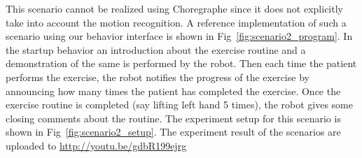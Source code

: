 This scenario cannot be realized using Choregraphe since it does not explicitly take into account the motion recognition. A reference implementation of such a scenario using our behavior interface is shown in Fig~\ref{fig:scenario2_program}. In the startup behavior an introduction about the exercise routine and a demonstration of the same is performed by the robot. Then each time the patient performs the exercise, the robot notifies the progress of the exercise by announcing how many times the patient has completed the exercise. Once the exercise routine is completed (say lifting left hand 5 times), the robot gives some closing comments about the routine. The experiment setup for this scenario is shown in Fig~\ref{fig:scenario2_setup}. The experiment result of the scenarios are uploaded to \url{http://youtu.be/gdbR199ejrg}